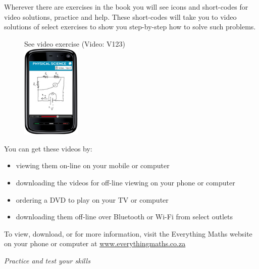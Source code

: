 {

Wherever there are exercises in the book you will see icons and short-codes for video solutions,
practice and help. These short-codes will take you to video solutions of select exercises to show you
step-by-step how to solve such problems. \par
\begin{figure}[H]
\begin{center}
See video exercise  (Video: V123)\vspace{0.2cm}\\ 
\vspace{0.2cm}
\includegraphics[width=0.25\textwidth]{title_images/mobilevideoexercise.png}
\end{center}
\end{figure}
You can get these videos by:
\begin{itemize}
    \item viewing them on-line on your mobile or computer
    \item downloading the videos for off-line viewing on your phone or computer
    \item ordering a DVD to play on your TV or computer
    \item downloading them off-line over Bluetooth or Wi-Fi from select outlets
\end{itemize}
}



To view, download, or for more information, visit the Everything Maths website on your phone or
computer at \underline{www.everythingmaths.co.za}  \par
\vspace*{1cm}
\thispagestyle{empty}
{\normalfont\sffamily\fontsize{22}\normalfont\itshape Practice and test your skills} \par


